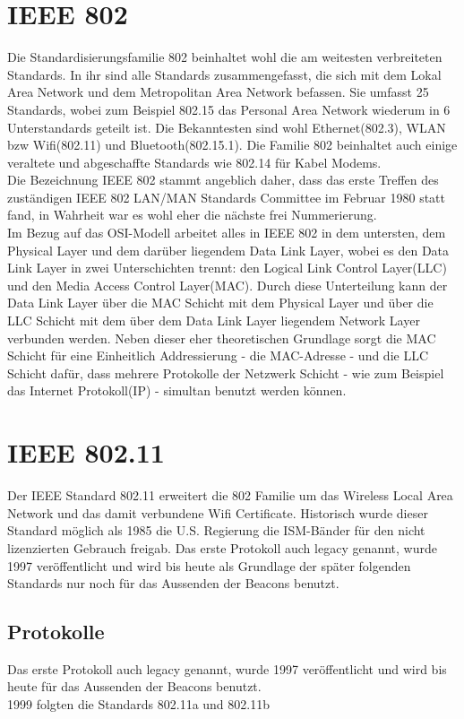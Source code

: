 \documentclass[a4paper,13pt]{scrartcl}
\begin{document}
\section{IEEE 802}
Die Standardisierungsfamilie 802 beinhaltet wohl die am weitesten verbreiteten Standards. In ihr sind alle Standards zusammengefasst, die sich mit dem Lokal Area Network und dem Metropolitan Area Network befassen. Sie umfasst 25 Standards, wobei zum Beispiel 802.15 das Personal Area Network wiederum in 6 Unterstandards geteilt ist. Die Bekanntesten sind wohl Ethernet(802.3), WLAN bzw Wifi(802.11) und Bluetooth(802.15.1). Die Familie 802 beinhaltet auch einige veraltete und abgeschaffte Standards wie 802.14 für Kabel Modems. \\
Die Bezeichnung IEEE 802 stammt angeblich daher, dass das erste Treffen des zuständigen \glqq IEEE 802 LAN/MAN Standards Committee \grqq  im Februar 1980 statt fand, in Wahrheit war es wohl eher die nächste frei Nummerierung.\\
Im Bezug auf das OSI-Modell arbeitet alles in IEEE 802 in dem untersten, dem Physical Layer und dem darüber liegendem Data Link Layer, wobei es den Data Link Layer in zwei Unterschichten trennt: den Logical Link Control Layer(LLC) und den Media Access Control Layer(MAC). Durch diese Unterteilung kann der Data Link Layer über die MAC Schicht mit dem Physical Layer und über die LLC Schicht mit dem über dem Data Link Layer liegendem Network Layer verbunden werden. Neben dieser eher theoretischen Grundlage sorgt die MAC Schicht für eine Einheitlich Addressierung - die MAC-Adresse - und die LLC Schicht dafür, dass mehrere Protokolle der Netzwerk Schicht - wie zum Beispiel das Internet Protokoll(IP) - simultan benutzt werden können. \newpage
\section{IEEE 802.11}
Der IEEE Standard 802.11 erweitert die 802 Familie um das Wireless Local Area Network und das damit verbundene Wifi Certificate. Historisch wurde dieser Standard möglich als 1985 die U.S. Regierung die ISM-Bänder für den nicht lizenzierten Gebrauch freigab. Das erste Protokoll auch legacy genannt, wurde 1997 veröffentlicht und wird bis heute als Grundlage der später folgenden Standards nur noch für das Aussenden der Beacons benutzt.
\subsection{Protokolle}
Das erste Protokoll auch legacy genannt, wurde 1997 veröffentlicht und wird bis heute für das Aussenden der Beacons benutzt. \\
1999 folgten die Standards 802.11a und 802.11b
\clearpage
\end{document}
